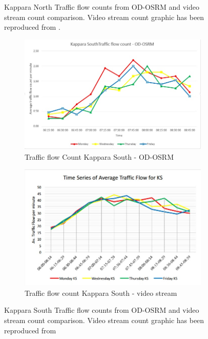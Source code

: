 \documentclass[12pt, a4paper]{report}
\theoremstyle{definition}
\theoremstyle{definition}%
\theoremstyle{definition}%
\theoremstyle{definition}%
\theoremstyle{definition}%
\theoremstyle{definition}%
\begin{document}
\begin{figure}[!]
	\caption[Kappara North Traffic flow counts from OD-OSRM and video stream count comparison]{Kappara North Traffic flow counts from OD-OSRM and video stream count comparison. Video stream count graphic has been reproduced from \cite{Pace2017}.}
	\label{fig:kappara_north_traffic_flow_line_chart}
\end{figure}

\begin{figure}[!] 
	\centering
	\begin{subfigure}{0.8\textwidth}
		\centering
		\includegraphics[width=\linewidth]{traffic_flow_count_KS_MINE.jpg} 
		\caption{\scriptsize{Traffic flow Count Kappara South - OD-OSRM}} 
		\label{fig:traffic_flow_count_KS_MINE}
	\end{subfigure}
	
	\vspace{1cm}
	\begin{subfigure}{0.8\textwidth}
		\centering
		\includegraphics[width=\linewidth]{traffic_flow_count_KS_Nigel_pace.jpg} 
		\caption{\scriptsize{Traffic flow count Kappara South - video stream}}
		\label{fig:traffic_flow_count_KS_NP}
	\end{subfigure}
	\caption[Kappara South Traffic flow counts from OD-OSRM and video stream count comparison]{Kappara South Traffic flow counts from OD-OSRM and video stream count comparison. Video stream count graphic has been reproduced from \cite{Pace2017}}
	\label{fig:kappara_south_traffic_flow_line_chart}
\end{figure}
\end{document}
